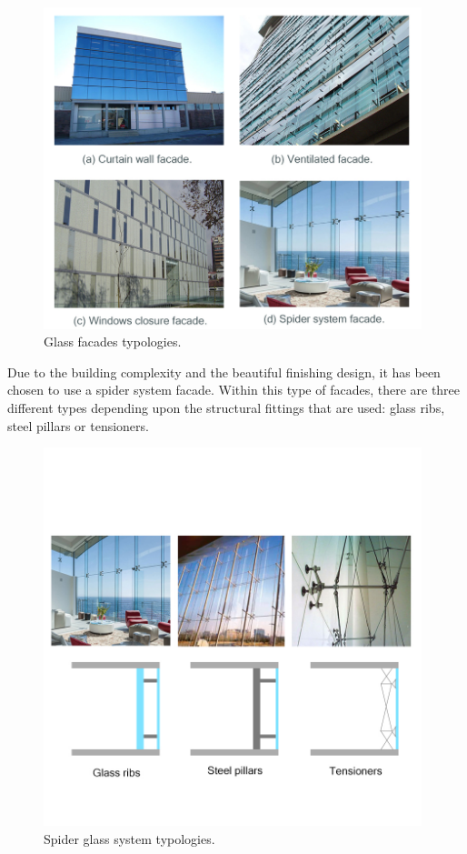 	\begin{figure}[H]
	\centering
\includegraphics[width=11cm]{./images/Facade/facades}
\caption{Glass facades typologies.}
\end{figure}

Due to the building complexity and the beautiful finishing design, it has been chosen to use a spider system facade. Within this type of facades, there are three different types depending upon the structural fittings that are used: glass ribs, steel pillars or tensioners.

	\begin{figure}[H]
	\centering
\includegraphics[width=11cm]{./images/Facade/spiders}
\caption{Spider glass system typologies.}
\end{figure}

